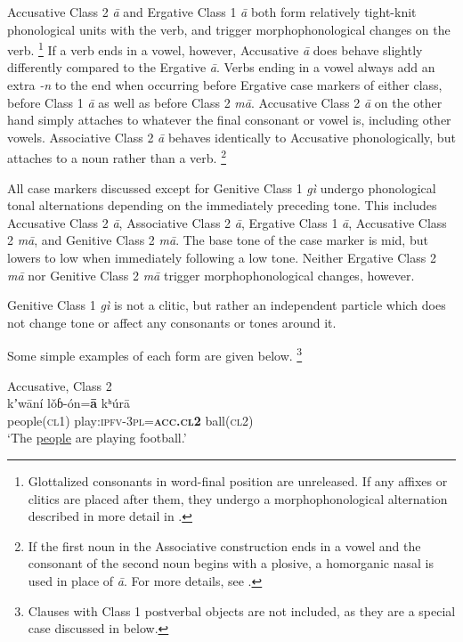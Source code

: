 \documentclass[output=collectionpaper,hidelinks]{langscibook}
\theoremstyle{remark}
\begin{document}
Accusative Class 2 \emph{ā} and Ergative Class 1 \emph{ā} both form relatively
tight-knit phonological units with the verb, and trigger morphophonological
changes on the verb.%
\footnote{Glottalized consonants in word-final position are
unreleased. If any affixes or clitics are placed after them, they undergo a
morphophonological alternation described in more detail in
\citet[48]{Killian2015}.} %
If a verb ends in a vowel, however, Accusative \emph{ā} does behave slightly
differently compared to the Ergative \emph{ā}.  Verbs ending in a vowel always
add an extra \emph{-n} to the end when occurring before Ergative case markers of
either class, before Class 1 \emph{ā} as well as before Class 2 \emph{mā}.
Accusative Class 2 \emph{ā} on the other hand simply attaches to whatever the
final consonant or vowel is, including other vowels.  Associative Class 2
\emph{ā} behaves identically to Accusative phonologically, but attaches to a
noun rather than a verb.%
\footnote{If the first noun in the Associative construction ends in a vowel and
the consonant of the second noun begins with a plosive, a homorganic nasal is
used in place of \emph{ā}.  For more details, see \citet[89]{Killian2015}.}

All case markers discussed except for Genitive Class 1 \emph{gì} undergo
phonological tonal alternations depending on the immediately preceding tone.
This includes Accusative Class 2 \emph{ā}, Associative Class 2 \emph{ā},
Ergative Class 1 \emph{ā}, Accusative Class 2 \emph{mā}, and Genitive Class 2
\emph{mā}.  The base tone of the case marker is mid, but lowers to low when
immediately following a low tone.  Neither Ergative Class 2 \emph{mā} nor
Genitive Class 2 \emph{mā} trigger morphophonological changes, however.

Genitive Class 1 \emph{gì} is not a clitic, but rather an independent particle
which does not change tone or affect any consonants or tones around it.

Some simple examples of each form are given below.%
\footnote{Clauses with Class 1
postverbal objects are not included, as they are a special case discussed in
  below.}

\ea
 Accusative, Class 2 \\
\gll kʼwāní lǒɓ-ón=\textbf{ā} kʰúrā \\
 people(\textsc{cl1}) play:\textsc{ipfv}-\textsc{3pl}=\textbf{\textsc{acc.cl2}} ball(\textsc{cl2}) \\
\glt `The \uline{people} are playing football.' \\
\z
\end{document}
